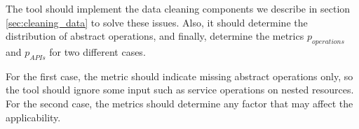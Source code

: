 The tool should implement the data cleaning components we describe in section \ref{sec:cleaning_data} to solve these issues.
Also, it should determine the distribution of abstract operations, and finally, determine the metrics \(p_{operations}\) and \(p_{APIs}\) for two different cases. 

For the first case, the metric should indicate missing abstract operations only, so the tool should ignore some input such as service operations on nested resources. For the second case, the metrics should determine any factor that may affect the applicability. 

